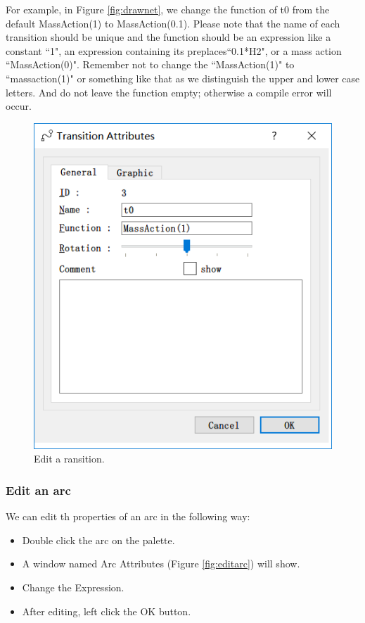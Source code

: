 \documentclass[journal,a4paper,onecolumn]{article}
\begin{document}
For example, in Figure \ref{fig:drawnet}, we change the function of t0 from the default MassAction(1) to MassAction(0.1). Please note that the name of each transition should be unique and the function should be an expression like a constant ``1", an expression containing its preplaces``0.1*H2", or a mass action ``MassAction(0)". Remember not to change the ``MassAction(1)" to ``massaction(1)" or something like that as we distinguish the upper and lower case letters. And do not leave the function empty; otherwise a compile error will occur.

\begin{figure}[!hbt]
	\begin{center}
		\includegraphics[width=0.8\columnwidth]{fig4}
		\caption{Edit a ransition.}
		\label{fig:edittransition}
	\end{center}
\end{figure}



\subsubsection{Edit an arc}
We can edit th properties of an arc in the following way:
\begin{itemize}
	\item Double click the arc on the palette.
	\item A window named Arc Attributes (Figure \ref{fig:editarc}) will show.
	\item Change the Expression.
	\item After editing, left click the OK button.
\end{itemize}
\end{document}
